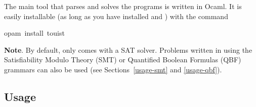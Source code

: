 \noindent The main tool that parses and solves the \touist programs is written in
Ocaml. It is easily installable (as long as you have installed 
and ) with the command%
\begin{mdpre}%
\noindent{}opam~install~touist%
\end{mdpre}
\noindent\textbf{Note}.
By default,  only comes with a SAT solver. Problems written in
\touist using the Satisfiability Modulo Theory (SMT) or Quantified
Boolean Formulas (QBF) grammars can also be used (see Sections~\ref{usage-smt} and
\ref{usage-qbf}).%

\noindent{}%


\subsection{Usage}\label{cli}%

